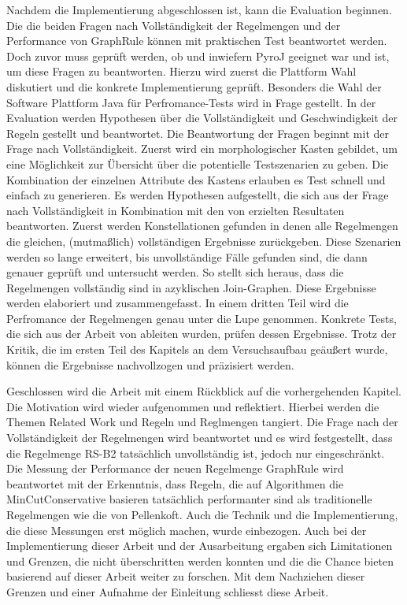 Nachdem die Implementierung abgeschlossen ist, kann die Evaluation beginnen. Die die beiden Fragen nach Vollständigkeit der Regelmengen und der Performance von GraphRule können mit praktischen Test beantwortet werden. Doch zuvor muss geprüft werden, ob und inwiefern PyroJ geeignet war und ist, um diese Fragen zu beantworten. Hierzu wird zuerst die Plattform Wahl diskutiert und die konkrete Implementierung geprüft. Besonders die Wahl der Software Plattform Java für Perfromance-Tests wird in Frage gestellt. In der Evaluation werden Hypothesen über die Vollständigkeit und Geschwindigkeit der Regeln gestellt und beantwortet. Die Beantwortung der Fragen beginnt mit der Frage nach Vollständigkeit. Zuerst wird ein morphologischer Kasten gebildet, um eine Möglichkeit zur Übersicht über die potentielle Testszenarien zu geben. Die Kombination der einzelnen Attribute des Kastens erlauben es Test schnell und einfach zu generieren. Es werden Hypothesen aufgestellt, die sich aus der Frage nach Vollständigkeit in Kombination mit den von \cite{shanbhag2014optimizing} erzielten Resultaten  beantworten. Zuerst werden Konstellationen gefunden in denen alle Regelmengen die gleichen, (mutmaßlich) vollständigen Ergebnisse zurückgeben. Diese Szenarien werden so lange erweitert, bis unvollständige Fälle gefunden sind, die dann genauer geprüft und untersucht werden. So stellt sich heraus, dass die Regelmengen vollständig sind in azyklischen Join-Graphen. Diese Ergebnisse werden elaboriert und zusammengefasst. In einem dritten Teil wird die Perfromance der Regelmengen genau unter die Lupe genommen. Konkrete Tests, die sich aus der Arbeit von \cite{shanbhag2014optimizing} ableiten wurden, prüfen dessen Ergebnisse. Trotz der Kritik, die im ersten Teil des Kapitels an dem Versuchsaufbau geäußert wurde, können die Ergebnisse nachvollzogen und präzisiert werden.

Geschlossen wird die Arbeit mit einem Rückblick auf die vorhergehenden Kapitel. Die Motivation wird wieder aufgenommen und reflektiert. Hierbei werden die Themen Related Work und Regeln und Reglmengen tangiert. Die Frage nach der Vollständigkeit der Regelmengen wird beantwortet und es wird festgestellt, dass die Regelmenge RS-B2 tatsächlich unvollständig ist, jedoch nur eingeschränkt. Die Messung der Performance der neuen Regelmenge GraphRule wird beantwortet mit der Erkenntnis, dass Regeln, die auf Algorithmen die MinCutConservative basieren tatsächlich performanter sind als traditionelle Regelmengen wie die von Pellenkoft. Auch die Technik und die Implementierung, die diese Messungen erst möglich machen, wurde einbezogen. Auch bei der Implementierung dieser Arbeit und der Ausarbeitung ergaben sich Limitationen und Grenzen, die nicht überschritten werden konnten und die die Chance bieten basierend auf dieser Arbeit weiter zu forschen. Mit dem Nachziehen dieser Grenzen und einer Aufnahme der Einleitung schliesst diese Arbeit.
